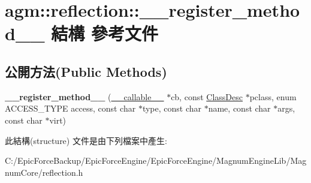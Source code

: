 \hypertarget{structagm_1_1reflection_1_1____register__method____}{}\section{agm\+:\+:reflection\+:\+:\+\_\+\+\_\+register\+\_\+method\+\_\+\+\_\+ 結構 參考文件}
\label{structagm_1_1reflection_1_1____register__method____}
\subsection*{公開方法(Public Methods)}
\begin{DoxyCompactItemize}
\item 
{\bfseries \+\_\+\+\_\+register\+\_\+method\+\_\+\+\_\+} (\hyperlink{structagm_1_1reflection_1_1____callable____}{\+\_\+\+\_\+callable\+\_\+\+\_\+} $\ast$cb, const \hyperlink{classagm_1_1reflection_1_1_class_desc}{Class\+Desc} $\ast$pclass, enum A\+C\+C\+E\+S\+S\+\_\+\+T\+Y\+PE access, const char $\ast$type, const char $\ast$name, const char $\ast$args, const char $\ast$virt)\hypertarget{structagm_1_1reflection_1_1____register__method_____aac424fb1384678320939461277f022fc}{}\label{structagm_1_1reflection_1_1____register__method_____aac424fb1384678320939461277f022fc}

\end{DoxyCompactItemize}


此結構(structure) 文件是由下列檔案中產生\+:\begin{DoxyCompactItemize}
\item 
C\+:/\+Epic\+Force\+Backup/\+Epic\+Force\+Engine/\+Epic\+Force\+Engine/\+Magnum\+Engine\+Lib/\+Magnum\+Core/reflection.\+h\end{DoxyCompactItemize}
